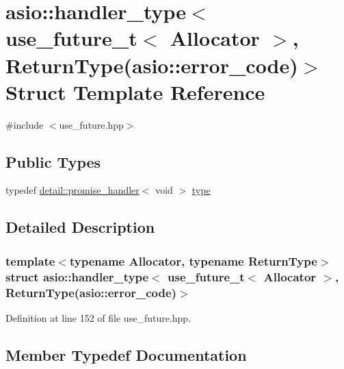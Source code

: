 \hypertarget{structasio_1_1handler__type_3_01use__future__t_3_01_allocator_01_4_00_01_01_01_01_01_01_01_01_01e03a2a25b6ea2f5e6fbc374eca266e19}{}\section{asio\+:\+:handler\+\_\+type$<$ use\+\_\+future\+\_\+t$<$ Allocator $>$, Return\+Type(asio\+:\+:error\+\_\+code)$>$ Struct Template Reference}
\label{structasio_1_1handler__type_3_01use__future__t_3_01_allocator_01_4_00_01_01_01_01_01_01_01_01_01e03a2a25b6ea2f5e6fbc374eca266e19}


{\ttfamily \#include $<$use\+\_\+future.\+hpp$>$}

\subsection*{Public Types}
\begin{DoxyCompactItemize}
\item 
typedef \hyperlink{classasio_1_1detail_1_1promise__handler}{detail\+::promise\+\_\+handler}$<$ void $>$ \hyperlink{structasio_1_1handler__type_3_01use__future__t_3_01_allocator_01_4_00_01_01_01_01_01_01_01_01_01e03a2a25b6ea2f5e6fbc374eca266e19_a8d732ade8f0fbf4f1950311ed58a1e4c}{type}
\end{DoxyCompactItemize}


\subsection{Detailed Description}
\subsubsection*{template$<$typename Allocator, typename Return\+Type$>$struct asio\+::handler\+\_\+type$<$ use\+\_\+future\+\_\+t$<$ Allocator $>$,           Return\+Type(asio\+::error\+\_\+code)$>$}



Definition at line 152 of file use\+\_\+future.\+hpp.



\subsection{Member Typedef Documentation}
\hypertarget{structasio_1_1handler__type_3_01use__future__t_3_01_allocator_01_4_00_01_01_01_01_01_01_01_01_01e03a2a25b6ea2f5e6fbc374eca266e19_a8d732ade8f0fbf4f1950311ed58a1e4c}{}
